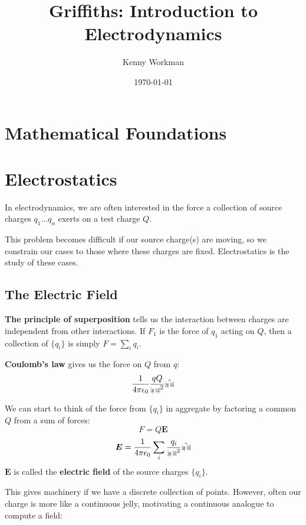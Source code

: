 \documentclass[10pt]{article}
\title{Griffiths: Introduction to Electrodynamics}
\author{Kenny Workman}
\date{\today}
\def\rcurs{{\mbox{$\resizebox{.16in}{.08in}{\texttt{[image: ScriptR]}}$}}}
\def\brcurs{{\mbox{$\resizebox{.16in}{.08in}{\texttt{[image: BoldR]}}$}}}
\def\hrcurs{{\mbox{$\hat \brcurs$}}}
\begin{document}
\maketitle

\section{Mathematical Foundations}

\section{Electrostatics}

In electrodynamics, we are often interested in the force a collection of source charges $q_1 \dots q_n$ exerts on a test charge $Q$.

This problem becomes difficult if our source charge(s) are moving, so we constrain our cases to those where these charges are fixed. Electrostatics is the study of these cases.

\subsection{The Electric Field}

\begin{definition}
	\textbf{The principle of superposition} tells us the interaction between charges are independent from other interactions. If $F_1$ is the force of $q_1$ acting on $Q$, then a collection of $\{q_i\}$ is simply $F = \sum_i q_i$.
\end{definition}

\begin{definition}
	\textbf{Coulomb's law} gives us the force on $Q$ from $q$:
	\[\frac 1 {4\pi\epsilon_0} \frac {qQ} {\rcurs^2} \hrcurs \]
\end{definition}

\begin{definition}
	We can start to think of the force from $\{q_i\}$ in aggregate by factoring a common $Q$ from a sum of forces:
	\[F = Q\boldsymbol{E}\]
	\[\boldsymbol{E} = \frac 1 {4\pi\epsilon_0} \sum_i \frac{q_i}{\brcurs^2} \hrcurs\]
	$\boldsymbol{E}$ is called the \textbf{electric field} of the source charges $\{q_i\}$.
\end{definition}

This gives machinery if we have a discrete collection of points. However, often our charge is more like a continuous jelly, motivating a continuous analogue to compute a field:
\end{document}
